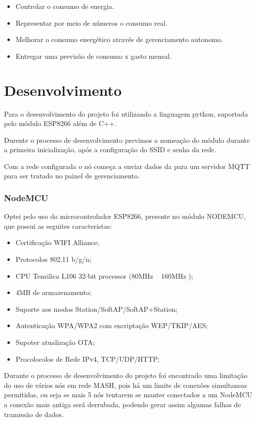 \documentclass[openright]{normas-utf-tex} %
\begin{document}
\begin{itemize}
	\item Controlar o consumo de energia.
	\item Representar por meio de números o consumo real. 
	\item Melhorar o consumo energético através de gerenciamento autonomo.
	\item Entregar uma previsão de consumo x gasto mensal.
\end{itemize}


\chapter{Desenvolvimento}
\label{chap:desenv}
 
Para o desenvolvimento do projeto foi utilizando a linguagem python, suportada pelo módulo ESP8266 além de C++.

Durente o processo de desenvolvimento previmos a nomeação do módulo durante a primeira inicialização, após a configuração do SSID e senha da rede.

Com a rede configurada o nó começa a enviar dados da para um servidor MQTT para ser tratado no painel de gerenciamento. 

\subsection{NodeMCU}
Optei pelo uso do microcontrolador ESP8266, presente no módulo NODEMCU, que possui as seguites caracteristas:
\begin{itemize}
    \item Certificação WIFI Alliance;
    \item Protocolos 802.11 b/g/n;
    \item CPU Tensilica L106 32-bit processor (80MHz ~ 160MHz );
    \item 4MB de armazenamento;
    \item Suporte aos modos Station/SoftAP/SoftAP+Station;
    \item Autenticação WPA/WPA2 com encriptação WEP/TKIP/AES;
    \item Supoter atualização OTA;
    \item Procolocolos de Rede IPv4, TCP/UDP/HTTP;
\end{itemize}

Durante o processo de desenvolvimento do projeto foi encontrado uma limitação do uso de vários nós em rede MASH, pois há um limite de conexões simultaneas permitidas, ou seja se mais 5 nós tentarem se manter conectados a um NodeMCU a conexão mais antiga será derrubada, podendo gerar assim algumas falhas de tramissão de dados. 
\end{document}

